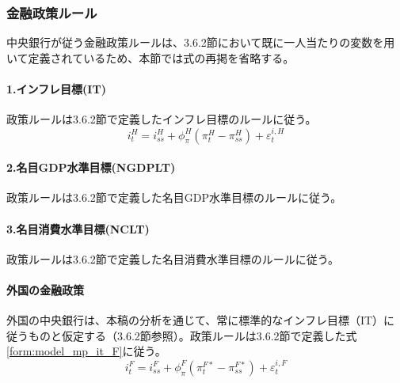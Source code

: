 \subsubsection{金融政策ルール}
\label{sec:chapter3_final_equations_policy_monetary}
中央銀行が従う金融政策ルールは、3.6.2節において既に一人当たりの変数を用いて定義されているため、本節では式の再掲を省略する。

\paragraph{1.インフレ目標(IT)}\label{sec:chapter3_final_equations_policy_monetary_it}
政策ルールは3.6.2節で定義したインフレ目標のルールに従う。
\begin{equation}
i_t^H=i_{ss}^H+\phi_\pi^H(\pi_t^H-\pi_{ss}^H)+\varepsilon_t^{i,H}
\label{form:model_final_equations_mp_it_h}
\end{equation}

\paragraph{2.名目GDP水準目標(NGDPLT)}\label{sec:chapter3_final_equations_policy_monetary_ngdplt}
政策ルールは3.6.2節で定義した名目GDP水準目標のルールに従う。

\paragraph{3.名目消費水準目標(NCLT)}\label{sec:chapter3_final_equations_policy_monetary_nclt}
政策ルールは3.6.2節で定義した名目消費水準目標のルールに従う。

\paragraph{外国の金融政策}\label{sec:chapter3_final_equations_policy_monetary_foreign}
外国の中央銀行は、本稿の分析を通じて、常に標準的なインフレ目標（IT）に従うものと仮定する（3.6.2節参照）。政策ルールは3.6.2節で定義した式\eqref{form:model_mp_it_F}に従う。
\begin{equation}
i_t^F=i_{ss}^F+\phi_\pi^F(\pi_t^{F*}-\pi_{ss}^{F*})+\varepsilon_t^{i,F}
\label{form:model_final_equations_mp_it_f}
\end{equation}